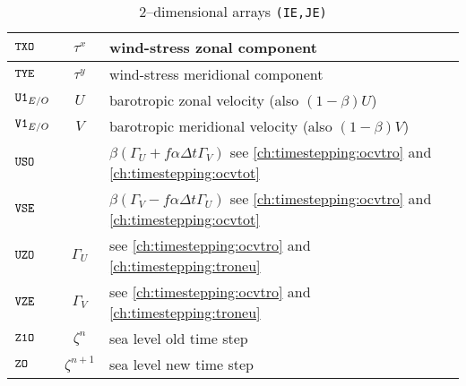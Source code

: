 \begin{table}[!bh]
\begin{footnotesize}
{{\begin{tabular}{|l|c|l|}
$\mbox{\tt TXO}$ & $\tau^x$ & wind-stress zonal component  \\ \hline
$\mbox{\tt TYE}$ &$\tau^y$ &wind-stress meridional component   \\ \hline
$\mbox{\tt U1}_{E/O}$ & $U$  & barotropic zonal velocity (also $(1-\beta) U$)   \\ \hline
$\mbox{\tt V1}_{E/O}$ & $V$  & barotropic meridional velocity (also $(1-\beta) V$)    \\ \hline
$\mbox{\tt USO}$ &  & $\beta(\Gamma_U+f\alpha\Delta t\Gamma_V)$ see \ref{ch:timestepping:ocvtro} and \ref{ch:timestepping:ocvtot} \\ \hline
$\mbox{\tt VSE}$ &  & $\beta(\Gamma_V-f\alpha\Delta t\Gamma_U)$ see \ref{ch:timestepping:ocvtro} and \ref{ch:timestepping:ocvtot}  \\ \hline
$\mbox{\tt UZO}$ &$\Gamma_U$  &  see \ref{ch:timestepping:ocvtro} and \ref{ch:timestepping:troneu} \\ \hline
$\mbox{\tt VZE}$ &$\Gamma_V$  &  see \ref{ch:timestepping:ocvtro} and \ref{ch:timestepping:troneu}  \\ \hline
$\mbox{\tt Z1O}$ & $\zeta^n$ &  sea level old time step  \\ \hline
$\mbox{\tt ZO}$  & $\zeta^{n+1}$ & sea level new time step\\ \hline
\end{tabular}}}
\caption{ 2--dimensional arrays {\tt (IE,JE)}}
\end{footnotesize}
\end{table}


